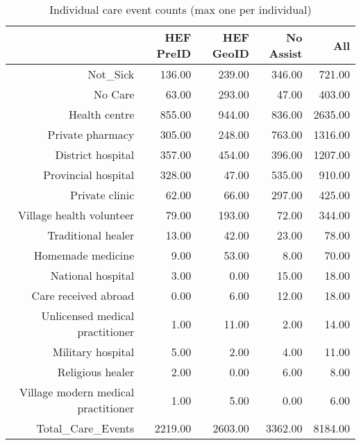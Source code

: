 \begin{table}[ht]
\centering
\begin{tabular}{rrrrr}
  \hline
 & HEF PreID & HEF GeoID & No Assist & All \\ 
  \hline
Not\_Sick & 136.00 & 239.00 & 346.00 & 721.00 \\ 
  No Care & 63.00 & 293.00 & 47.00 & 403.00 \\ 
  Health centre & 855.00 & 944.00 & 836.00 & 2635.00 \\ 
  Private pharmacy & 305.00 & 248.00 & 763.00 & 1316.00 \\ 
  District hospital & 357.00 & 454.00 & 396.00 & 1207.00 \\ 
  Provincial hospital & 328.00 & 47.00 & 535.00 & 910.00 \\ 
  Private clinic & 62.00 & 66.00 & 297.00 & 425.00 \\ 
  Village health volunteer & 79.00 & 193.00 & 72.00 & 344.00 \\ 
  Traditional healer & 13.00 & 42.00 & 23.00 & 78.00 \\ 
  Homemade medicine & 9.00 & 53.00 & 8.00 & 70.00 \\ 
  National hospital & 3.00 & 0.00 & 15.00 & 18.00 \\ 
  Care received abroad & 0.00 & 6.00 & 12.00 & 18.00 \\ 
  Unlicensed medical practitioner & 1.00 & 11.00 & 2.00 & 14.00 \\ 
  Military hospital & 5.00 & 2.00 & 4.00 & 11.00 \\ 
  Religious healer & 2.00 & 0.00 & 6.00 & 8.00 \\ 
  Village modern medical practitioner & 1.00 & 5.00 & 0.00 & 6.00 \\ 
  Total\_Care\_Events & 2219.00 & 2603.00 & 3362.00 & 8184.00 \\ 
   \hline
\end{tabular}
\caption{Individual care event counts (max one per individual)} 
\end{table}
